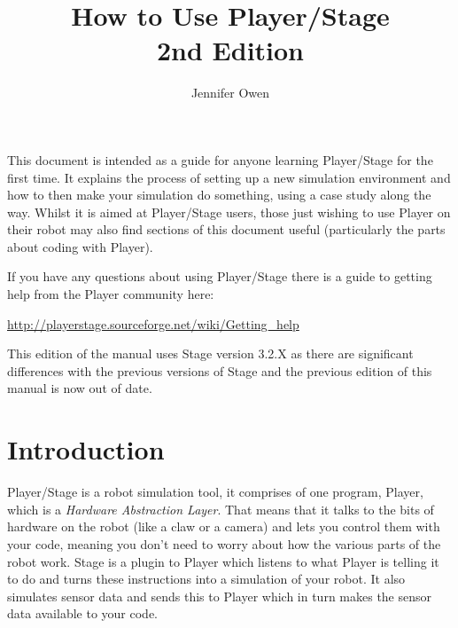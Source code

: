 \documentclass[a4paper]{report}
\title{How to Use Player/Stage\\ 2nd Edition}
\author{Jennifer Owen}
\newcommand{\plst}{Player/Stage\xspace}
\newcommand{\pl}{Player\xspace}
\begin{document}
\maketitle

This document is intended as a guide for anyone learning \plst for the first time. It explains the process of setting up a new simulation environment and how to then make your simulation do something, using a case study along the way. Whilst it is aimed at \plst users, those just wishing to use \pl on their robot may also find sections of this document useful (particularly the parts about coding with Player).

If you have any questions about using \plst there is a guide to getting help from the \pl community here:
\begin{center}
	\url{http://playerstage.sourceforge.net/wiki/Getting_help}
\end{center}
This edition of the manual uses Stage version 3.2.X as there are significant differences with the previous versions of Stage and the previous edition of this manual is now out of date. 




\tableofcontents


\chapter{Introduction}
\plst is a robot simulation tool, it comprises of one program, \pl, which is a \emph{Hardware Abstraction Layer}. That means that it talks to the bits of hardware on the robot (like a claw or a camera) and lets you control them with your code, meaning you don't need to worry about how the various parts of the robot work. Stage is a plugin to \pl which listens to what \pl is telling it to do and turns these instructions into a simulation of your robot. It also simulates sensor data and sends this to \pl which in turn makes the sensor data available to your code.
\end{document}
